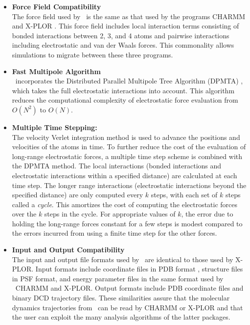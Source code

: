 \begin{itemize}

\item{\bf Force Field Compatibility}\\
The force field used by \NAMD\ is the same as that used by the programs 
CHARMM  and X-PLOR 
.  This force field includes local 
interaction terms consisting of bonded interactions between 2, 3, and 4 atoms 
and pairwise interactions including electrostatic and van der Waals forces.
This commonality allows simulations to migrate between these three programs.

\item{\bf Fast Multipole Algorithm}\\
\NAMD\ incorporates the Distributed Parallel Multipole Tree Algorithm 
(DPMTA) , which takes the full electrostatic
interactions into account.  This algorithm reduces the computational
complexity of electrostatic force evaluation from $O(N^2)$ to $O(N)$.

\item{\bf Multiple Time Stepping:}\\
The velocity Verlet integration method
is used to advance the positions and velocities of the atoms in time.
To further reduce the cost of the evaluation of 
long-range electrostatic forces, 
a multiple time step scheme is combined with the DPMTA method.  The local
interactions (bonded interactions and electrostatic interactions within a
specified distance) are calculated at each time step.  The longer range
interactions (electrostatic interactions beyond the specified distance) are
only computed every $k$ steps, with each set of $k$ steps called a {\em cycle}.
This
amortizes the cost of computing the electrostatic forces over the $k$ steps in
the cycle.  For appropriate values of $k$, the error due to holding the long-range
forces
constant for a few steps is modest compared to the errors incurred from using
a finite time step for the other forces.


\item{\bf Input and Output Compatibility}\\
The input and output file formats used by \NAMD\ are identical to those
used by X-PLOR.  Input formats include coordinate files in PDB format
, structure files in PSF format, 
and energy parameter files in the same format used by ~CHARMM and X-PLOR.
Output formats include PDB coordinate files and binary DCD trajectory files.
These similarities assure that the molecular dynamics trajectories from \NAMD\ 
can be read by CHARMM or X-PLOR and that the user can exploit the many 
analysis algorithms of the latter packages.


\end{itemize}
